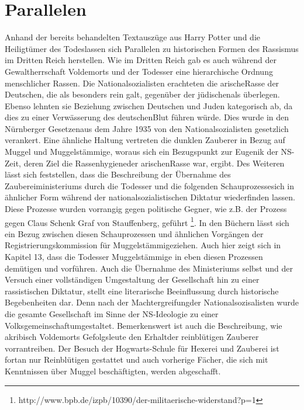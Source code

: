 \section {Parallelen}
Anhand der bereits behandelten Textauszüge aus \glqq Harry Potter und die Heiligtümer des Todes\grqq lassen sich Parallelen zu historischen Formen des Rassismus im Dritten Reich herstellen. Wie im Dritten Reich gab es auch während der Gewaltherrschaft Voldemorts und der Todesser eine hierarchische Ordnung menschlicher \glqq Rassen\grqq. 
Die Nationalsozialisten erachteten die \glqq arische\grqq Rasse der Deutschen, die als besonders rein galt, gegenüber der \glqq jüdischen\grqq als überlegen. Ebenso lehnten sie Beziehung zwischen Deutschen und Juden kategorisch ab, da dies zu einer Verwässerung des \glqq deutschen\grqq Blut führen würde. Dies wurde in den \glqq Nürnberger Gesetzen\grqq aus dem Jahre 1935 von den Nationalsozialisten gesetzlich verankert\cite[S.72]{MW121}. Eine ähnliche Haltung vertreten die dunklen Zauberer in Bezug auf Muggel und Muggelstämmige, woraus sich ein Bezugspunkt zur Eugenik der NS-Zeit, deren Ziel die \glqq Rassenhygiene\grqq der \glqq arischen\grqq Rasse war, ergibt.
Des Weiteren lässt sich feststellen, dass die Beschreibung der Übernahme des Zaubereiministeriums durch die Todesser und die folgenden \glqq Schauprozesse\grqq sich in ähnlicher Form während der nationalsozialistischen Diktatur wiederfinden lassen. Diese Prozesse wurden vorrangig gegen politische Gegner, wie z.B. der Prozess gegen Claus Schenk Graf von Stauffenberg, geführt \footnote{http://www.bpb.de/izpb/10390/der-militaerische-widerstand?p=1}. In den Büchern lässt sich ein Bezug zwischen diesen Schauprozessen und ähnlichen Vorgängen der \glqq Registrierungskommission für Muggelstämmige\grqq ziehen. Auch hier zeigt sich in Kapitel 13, dass die Todesser Muggelstämmige in eben diesen Prozessen demütigen und vorführen.
Auch die Übernahme des Ministeriums selbst und der Versuch einer  vollständigen Umgestaltung der Gesellschaft hin zu einer rassistischen Diktatur, stellt eine literarische Beeinflussung durch historische Begebenheiten dar. Denn nach der \glqq Machtergreifung\grqq der Nationalsozisalisten wurde die gesamte Gesellschaft im Sinne der NS-Ideologie zu einer \glqq Volksgemeinschaft\grqq umgestaltet. 
Bemerkenswert ist auch die Beschreibung, wie akribisch Voldemorts Gefolgsleute den \glqq Erhalt\grqq der reinblütigen Zauberer vorrantreiben. Der Besuch der Hogwarts-Schule für Hexerei und Zauberei ist fortan nur Reinblütigen gestattet und auch vorherige Fächer, die sich mit Kenntnissen über Muggel beschäftigten, werden abgeschafft. 
